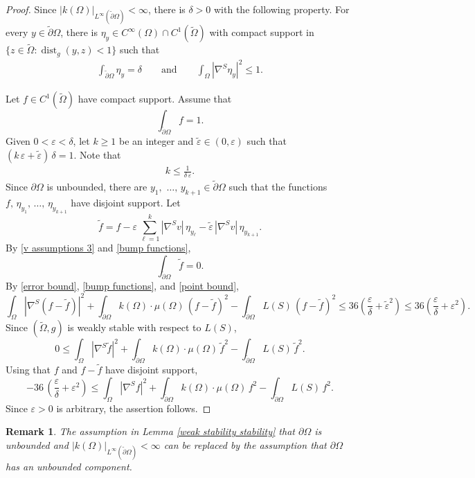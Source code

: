 \documentclass[11pt]{amsart}
\newtheorem{rema}[prop]{Remark}
\begin{document}
\begin{proof}
Since $|k(\Omega)|_{L^\infty(\tilde \partial \Omega)}<\infty$,  there is  $\delta>0$ with the following property. For every  $y\in \tilde \partial \Omega$, there is $\eta_y\in C^\infty(\Omega)\cap C^1(\tilde \Omega)$ with compact support in $\{z\in \tilde \Omega:\operatorname{dist}_g(y,z)<1\}$ such that
	\begin{align} \label{bump functions} 
	\int_{\tilde \partial \Omega} \eta_y=\delta\qquad\text{and}\qquad \int_{\Omega} |\nabla^S \eta_y|^2 \leq 1.
	\end{align} 

	
 Let $f\in C^1(\tilde \Omega)$ have compact support. Assume that 
 	$$\int_{\tilde \partial \Omega} f=1.
	$$
	Given $0<\varepsilon<\delta$, let $k\geq 1$ be an integer and  $\tilde \varepsilon\in(0,\varepsilon)$ such that $(k\,\varepsilon+\tilde \varepsilon)\,\delta=1.$ Note that 
	\begin{align} \label{point bound} 
	k\leq \frac{1}{\delta\,\varepsilon}.
	\end{align} 
Since  $\partial \Omega$ is unbounded,	there are $y_1,\,\,\ldots, \, y_{k+1}\in \tilde \partial \Omega$ such that the functions  $f,\,\eta_{y_1},\, \ldots,\, \eta_{y_{k+1}}$  have disjoint support. Let 
$$
\tilde f=f-\varepsilon\,\sum_{\ell=1}^k|\nabla^Sv|\,\eta_{y_\ell}-\tilde \varepsilon\,|\nabla^Sv|\,\eta_{y_{k+1}}.
$$ 
By \eqref{v assumptions 3} and \eqref{bump functions},
	$$
	\int_{\tilde \partial \Omega} \tilde f=0.
	$$
	By \eqref{error bound}, \eqref{bump functions}, and \eqref{point bound},
	$$
	\int_{\Omega} |\nabla^S (f-\tilde f)|^2+ \int_{\tilde \partial \Omega} k(\Omega)\cdot \mu(\Omega)\,(f-\tilde f)^2-\int_{\tilde \partial \Omega}L(S)\,(f-\tilde f)^2\leq 36\left(\frac{\varepsilon}{\delta}+\tilde \varepsilon^2\right)\leq 36\left(\frac{\varepsilon}{\delta}+\varepsilon^2\right).
	$$
	Since $(\tilde \Omega,g)$ is weakly stable with respect to $L(S)$, 
	$$
0\leq 	\int_{\Omega} |\nabla^S\tilde f|^2+ \int_{\tilde \partial \Omega} k(\Omega)\cdot \mu(\Omega)\,\tilde f^2-\int_{\tilde \partial \Omega}L(S)\,\tilde f^2.
	$$ 
Using that $f$ and $f-\tilde f$ have disjoint support, 
	$$
	-36\,\left(\frac{\varepsilon}{\delta}+\varepsilon^2\right)\leq 	\int_{\Omega} |\nabla^S f|^2+ \int_{\tilde \partial \Omega} k(\Omega)\cdot \mu(\Omega)\, f^2-\int_{\tilde \partial \Omega}L(S)\, f^2.
	$$
Since $\varepsilon>0$ is arbitrary, the assertion follows.
\end{proof}
\begin{rema}
	The assumption in Lemma \ref{weak stability stability} that $\partial \Omega$ is unbounded and  $|k(\Omega)|_{L^\infty(\tilde \partial \Omega)}<\infty$ can be replaced by the assumption that $\partial \Omega$ has an unbounded component. 
\end{rema}
\end{document}
